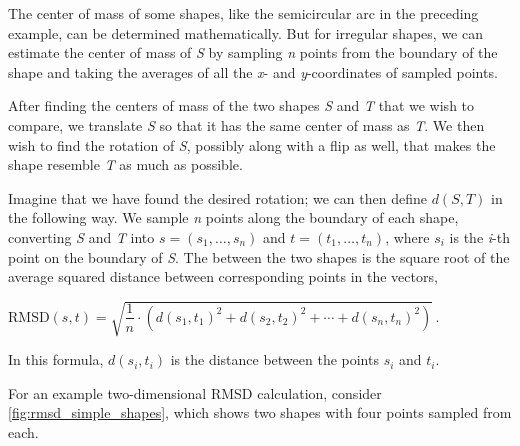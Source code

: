\begin{qbox}\end{qbox}

The center of mass of some shapes, like the semicircular arc in the preceding example, can be determined mathematically. But for irregular shapes, we can estimate the center of mass of \textit{S} by sampling \textit{n} points from the boundary of the shape and taking the averages of all the \textit{x}- and \textit{y}-coordinates of sampled points.

After finding the centers of mass of the two shapes \textit{S} and \textit{T} that we wish to compare, we translate \textit{S} so that it has the same center of mass as \textit{T}. We then wish to find the rotation of \textit{S}, possibly along with a flip as well, that makes the shape resemble \textit{T} as much as possible.

Imagine that we have found the desired rotation; we can then define $d(S, T)$ in the following way. We sample \textit{n} points along the boundary of each shape, converting \textit{S} and \textit{T} into  $s = (s_{1}, \ldots, s_{n})$ and $t = (t_{1}, \ldots, t_{n})$, where $s_{i}$ is the \textit{i}-th point on the boundary of \textit{S}. The  between the two shapes is the square root of the average squared distance between corresponding points in the vectors,

\begin{center}
$\text{RMSD}(s, t) = \sqrt{\dfrac{1}{n} \cdot \left(d(s_1, t_1)^2 + d(s_2, t_2)^2 + \cdots + d(s_n, t_n)^2\right)}\,. $
\end{center}

In this formula, $d(s_{i}, t_{i})$ is the distance between the points $s_{i}$ and $t_{i}$.

\begin{note}\end{note}

For an example two-dimensional RMSD calculation, consider \autoref{fig:rmsd_simple_shapes}, which shows two shapes with four points sampled from each.\\

